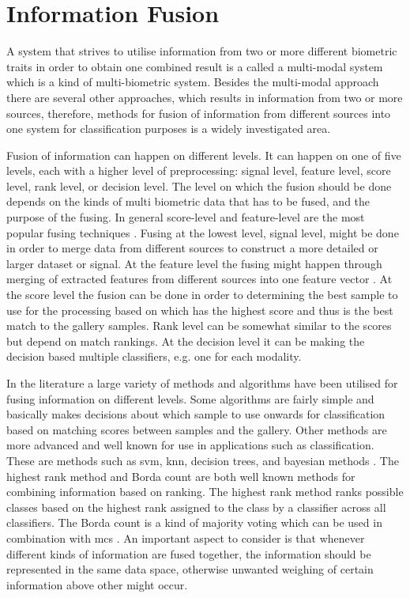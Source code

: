 \section{Information Fusion}

A system that strives to utilise information from two or more different biometric traits in order to obtain one combined result is a called a multi-modal system which is a kind of multi-biometric system. Besides the multi-modal approach there are several other approaches, which results in information from two or more sources, therefore, methods for fusion of information from different sources into one system for classification purposes is a widely investigated area. \citep{Bowyer2016b}

Fusion of information can happen on different levels. It can happen on one of five levels, each with a higher level of preprocessing: signal level, feature level, score level, rank level, or decision level. The level on which the fusion should be done depends on the kinds of multi biometric data that has to be fused, and the purpose of the fusing. In general score-level and feature-level are the most popular fusing techniques \citep{Bowyer2016b}. Fusing at the lowest level, signal level, might be done in order to merge data from different sources to construct a more detailed or larger dataset or signal. At the feature level the fusing might happen through merging of extracted features from different sources into one feature vector \citep{Ross2003}. At the score level the fusion can be done in order to determining the best sample to use for the processing based on which has the highest score and thus is the best match to the gallery samples. Rank level can be somewhat similar to the scores but depend on match rankings. At the decision level it can be making the decision based multiple classifiers, e.g. one for each modality\citep{Fierrez2018b}.

In the literature a large variety of methods and algorithms have been utilised for fusing information on different levels. Some algorithms are fairly simple and basically makes decisions about which sample to use onwards for classification based on matching scores between samples and the gallery. Other methods are more advanced and well known for use in applications such as classification. These are methods such as \gls{svm}, \gls{knn}, decision trees, and bayesian methods \citep{Ross2003}. The highest rank method and Borda count are both well known methods for combining information based on ranking. The highest rank method ranks possible classes based on the highest rank assigned to the class by a classifier across all classifiers.\citep{Ho1994} The Borda count is a kind of majority voting which can be used in combination with \gls{mcs} \citep{Bowyer2016b,Ho1994}. An important aspect to consider is that whenever  different kinds of information are fused together, the information should be represented in the same data space, otherwise unwanted weighing of certain information above other might occur.  

